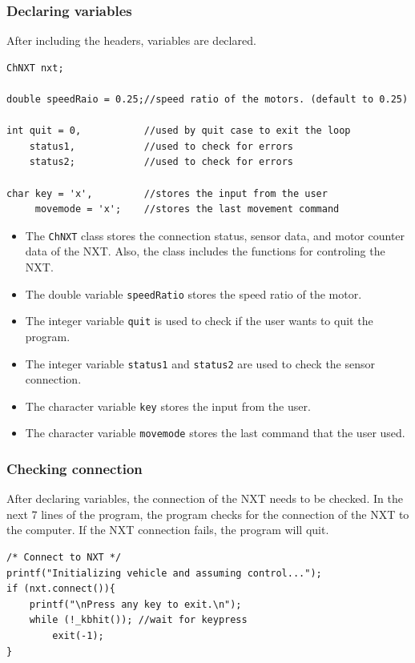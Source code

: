 \documentclass[11pt]{article}
\begin{document}
\subsubsection*{Declaring variables}
After including the headers, variables are declared.
\begin{lstlisting}
ChNXT nxt;

double speedRaio = 0.25;//speed ratio of the motors. (default to 0.25)

int quit = 0,           //used by quit case to exit the loop
    status1,            //used to check for errors
    status2;            //used to check for errors

char key = 'x',	        //stores the input from the user
     movemode = 'x';    //stores the last movement command
 \end{lstlisting}

\begin{itemize}
\item The {\tt ChNXT} class stores the connection status, sensor data, and motor 
    counter data of the NXT. Also, the class includes the functions for controling 
    the NXT.
\item The double variable {\tt speedRatio} stores the speed ratio of the motor.
\item The integer variable {\tt quit} is used to check if the user wants to quit 
    the program.
\item The integer variable {\tt status1} and {\tt status2} are used to check the 
    sensor connection.
\item The character variable {\tt key} stores the input from the user.
\item The character variable {\tt movemode} stores the last command that the user 
    used.
\end{itemize}

\subsubsection*{Checking connection}
After declaring variables, the connection of the NXT needs to be checked. In the 
next 7 lines of the program, the program checks for the connection of the NXT to 
the computer. If the NXT connection fails, the program will quit.
\begin{lstlisting}
/* Connect to NXT */
printf("Initializing vehicle and assuming control...");
if (nxt.connect()){
    printf("\nPress any key to exit.\n");
    while (!_kbhit()); //wait for keypress
        exit(-1);
}
\end{lstlisting}
\end{document}

